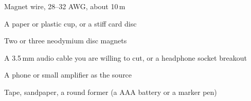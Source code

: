 



\begin{materials}
\item Magnet wire, 28--32 AWG, about 10\,m
\item A paper or plastic cup, or a stiff card disc
\item Two or three neodymium disc magnets
\item A 3.5\,mm audio cable you are willing to cut, or a headphone socket breakout
\item A phone or small amplifier as the source
\item Tape, sandpaper, a round former (a AAA battery or a marker pen)
\end{materials}

